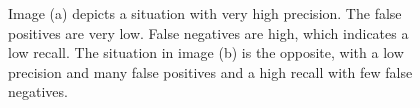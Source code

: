 \begin{figure}[H]%
    \centering
    \caption[Precision and Recall]{Image (a) depicts a situation with very high precision. The false positives are very low. False negatives are high, which indicates a low recall. The situation in image (b) is the opposite, with a low precision and many false positives and a high recall with few false negatives.}
    \label{precision_recall_metrics}
\end{figure}

